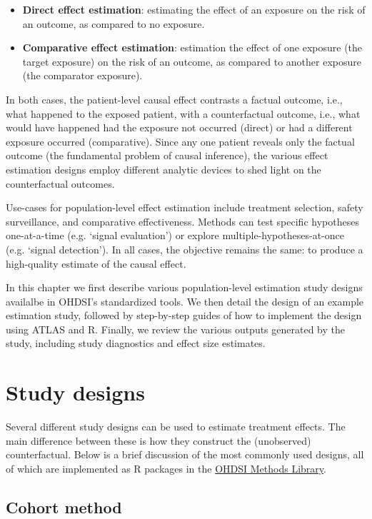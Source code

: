 \documentclass[11pt]{book}
\providecommand{\tightlist}{%
  \setlength{\itemsep}{0pt}\setlength{\parskip}{0pt}}
\begin{document}
\begin{itemize}
\tightlist
\item
  \textbf{Direct effect estimation}: estimating the effect of an
  exposure on the risk of an outcome, as compared to no exposure.
\item
  \textbf{Comparative effect estimation}: estimation the effect of one
  exposure (the target exposure) on the risk of an outcome, as compared
  to another exposure (the comparator exposure).
\end{itemize}

In both cases, the patient-level causal effect contrasts a factual
outcome, i.e., what happened to the exposed patient, with a
counterfactual outcome, i.e., what would have happened had the exposure
not occurred (direct) or had a different exposure occurred
(comparative). Since any one patient reveals only the factual outcome
(the fundamental problem of causal inference), the various effect
estimation designs employ different analytic devices to shed light on
the counterfactual outcomes.

Use-cases for population-level effect estimation include treatment
selection, safety surveillance, and comparative effectiveness. Methods
can test specific hypotheses one-at-a-time (e.g. `signal evaluation') or
explore multiple-hypotheses-at-once (e.g. `signal detection'). In all
cases, the objective remains the same: to produce a high-quality
estimate of the causal effect.

In this chapter we first describe various population-level estimation
study designs availalbe in OHDSI's standardized tools. We then detail
the design of an example estimation study, followed by step-by-step
guides of how to implement the design using ATLAS and R. Finally, we
review the various outputs generated by the study, including study
diagnostics and effect size estimates.

\section{Study designs}\label{study-designs}

Several different study designs can be used to estimate treatment
effects. The main difference between these is how they construct the
(unobserved) counterfactual. Below is a brief discussion of the most
commonly used designs, all of which are implemented as R packages in the
\href{https://ohdsi.github.io/MethodsLibrary/}{OHDSI Methods Library}.

\subsection{Cohort method}\label{CohortMethod}
\end{document}
